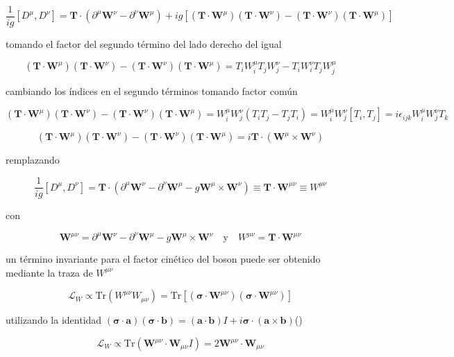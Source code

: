 $$ \frac{1}{ig}[D^{\mu}, D^{\nu}] = \textbf{T}\cdot(\partial^{\mu}\textbf{W}^{\nu} - \partial^{\nu}\textbf{W}^{\mu}) + ig[(\textbf{T}\cdot \textbf{W}^{\mu})(\textbf{T}\cdot \textbf{W}^{\nu}) - (\textbf{T}\cdot \textbf{W}^{\nu})(\textbf{T}\cdot \textbf{W}^{\mu})] $$

tomando el factor del segundo término del lado derecho del igual

$$ (\textbf{T}\cdot \textbf{W}^{\mu})(\textbf{T}\cdot \textbf{W}^{\nu}) - (\textbf{T}\cdot \textbf{W}^{\nu})(\textbf{T}\cdot \textbf{W}^{\mu}) = T_iW_i^{\mu}T_jW_j^{\nu} - T_iW_i^{\nu}T_jW_j^{\mu} $$

cambiando los índices en el segundo términos tomando factor común

$$ (\textbf{T}\cdot \textbf{W}^{\mu})(\textbf{T}\cdot \textbf{W}^{\nu}) - (\textbf{T}\cdot \textbf{W}^{\nu})(\textbf{T}\cdot \textbf{W}^{\mu}) = W_i^{\mu}W_j^{\nu}(T_iT_j - T_jT_i) = W_i^{\mu}W_j^{\nu}[T_i,T_j] =i\epsilon_{ijk}W_i^{\mu}W_j^{\nu}T_k $$

$$ (\textbf{T}\cdot \textbf{W}^{\mu})(\textbf{T}\cdot \textbf{W}^{\nu}) - (\textbf{T}\cdot \textbf{W}^{\nu})(\textbf{T}\cdot \textbf{W}^{\mu}) = i \textbf{T}\cdot (\textbf{W}^{\mu}\times \textbf{W}^{\nu}) $$

remplazando 

$$ \frac{1}{ig}[D^{\mu}, D^{\nu}] = \textbf{T}\cdot(\partial^{\mu}\textbf{W}^{\nu} - \partial^{\nu}\textbf{W}^{\mu} - g\textbf{W}^{\mu}\times \textbf{W}^{\nu}) \equiv \textbf{T}\cdot \textbf{W}^{\mu\nu}\equiv W^{\mu\nu} $$

con

$$ \textbf{W}^{\mu\nu} = \partial^{\mu}\textbf{W}^{\nu} - \partial^{\nu}\textbf{W}^{\mu} - g\textbf{W}^{\mu}\times \textbf{W}^{\nu} \quad \text{y} \quad W^{\mu\nu} = \textbf{T}\cdot\textbf{W}^{\mu\nu} $$

un término invariante para el factor cinético del boson puede ser obtenido mediante la traza de $W^{\mu\nu}$

$$ \mathcal{L}_W \propto \text{Tr}(W^{\mu\nu}W_{\mu\nu})=\text{Tr}[(\boldsymbol\sigma \cdot \textbf{W}^{\mu\nu})(\boldsymbol\sigma \cdot \textbf{W}^{\mu\nu})] $$

utilizando la identidad $(\boldsymbol\sigma \cdot \textbf{a})(\boldsymbol\sigma \cdot \textbf{b}) = (\textbf{a}\cdot\textbf{b})I + i\boldsymbol\sigma \cdot (\textbf{a}\times \textbf{b})$(\cite{thomson2013modern})

$$ \mathcal{L}_W \propto \text{Tr}(\textbf{W}^{\mu\nu}\cdot\textbf{W}_{\mu\nu}I) = 2\textbf{W}^{\mu\nu}\cdot\textbf{W}_{\mu\nu}  $$

